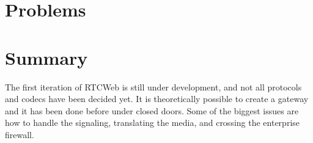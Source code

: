





\section{Problems}


\section{Summary}
The first iteration of RTCWeb is still under development, and not all protocols and codecs have been decided yet. It is theoretically possible to create a gateway and it has been done before under closed doors. Some of the biggest issues are how to handle the signaling, translating the media, and crossing the enterprise firewall.



